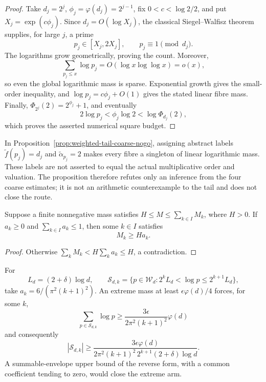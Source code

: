 \begin{proof}
Take $d_j=2^j$, $\phi_j=\varphi(d_j)=2^{j-1}$, fix
$0<c<\log2/2$, and put $X_j=\exp(c\phi_j)$.  Since
$d_j=O(\log X_j)$, the classical Siegel--Walfisz theorem supplies, for
large $j$, a prime
\[
 p_j\in[X_j,2X_j],\qquad p_j\equiv1\pmod {d_j}.
\]
The logarithms grow geometrically, proving the count.  Moreover,
\[
 \sum_{p_j\le x}\log p_j
   =O(\log x\log\log x)=o(x),
\]
so even the global logarithmic mass is sparse.  Exponential growth gives
the small-order inequality, and $\log p_j=c\phi_j+O(1)$ gives the stated
linear fibre mass.  Finally,
$\Phi_{2^j}(2)=2^{\phi_j}+1$, and eventually
\[
 2\log p_j<\phi_j\log2<\log\Phi_{d_j}(2),
\]
which proves the asserted numerical square budget.
\end{proof}

In Proposition~\ref{prop:weighted-tail-coarse-nogo}, assigning abstract
labels $\widetilde f(p_j)=d_j$ and
$\widetilde\alpha_{p_j}=2$ makes every fibre a singleton of linear
logarithmic mass.  These labels are not asserted to equal the actual
multiplicative order and valuation.  The proposition therefore refutes
only an inference from the four coarse estimates; it is not an
arithmetic counterexample to the tail and does not close the route.

\begin{proposition}
\label{prop:weighted-tail-profile-localization}
Suppose a finite nonnegative mass satisfies
$H\le M\le\sum_{k\in I}M_k$, where $H>0$.  If
$a_k\ge0$ and $\sum_{k\in I}a_k\le1$, then some $k\in I$ satisfies
\[
                              M_k\ge Ha_k.
\]
\end{proposition}

\begin{proof}
Otherwise $\sum_kM_k<H\sum_ka_k\le H$, a contradiction.
\end{proof}

For
\[
 L_d=(2+\delta)\log d,
 \qquad
 \mathcal S_{d,k}
 =\{p\in\mathcal W_d:2^kL_d<\log p\le2^{k+1}L_d\},
\]
take $a_k=6/(\pi^2(k+1)^2)$.  An extreme mass at least
$\epsilon\varphi(d)/4$ forces, for some $k$,
\[
 \sum_{p\in\mathcal S_{d,k}}\log p
 \ge\frac{3\epsilon}{2\pi^2(k+1)^2}\varphi(d)
\]
and consequently
\begin{equation}\label{eq:weighted-tail-shell-cardinality}
 |\mathcal S_{d,k}|
 \ge
 \frac{3\epsilon\varphi(d)}
 {2\pi^2(k+1)^2\,2^{k+1}(2+\delta)\log d}.
\end{equation}
A summable-envelope upper bound of the reverse form, with a common
coefficient tending to zero, would close the extreme arm.

